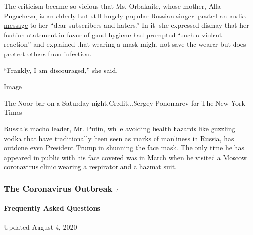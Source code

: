 The criticism became so vicious that Ms. Orbakaite, whose mother, Alla
Pugacheva, is an elderly but still hugely popular Russian singer,
\href{https://www.instagram.com/tv/CCHJPXkpV72/?utm_source=ig_embed}{posted
an audio message} to her ``dear subscribers and haters.'' In it, she
expressed dismay that her fashion statement in favor of good hygiene had
prompted ``such a violent reaction'' and explained that wearing a mask
might not save the wearer but does protect others from infection.

``Frankly, I am discouraged,'' she said.

Image

The Noor bar on a Saturday night.Credit...Sergey Ponomarev for The New
York Times

Russia's
\href{https://www.nytimes.com/2017/08/05/world/europe/vladimir-putin-russia-summer-vacation.html}{macho
leader}, Mr. Putin, while avoiding health hazards like guzzling vodka
that have traditionally been seen as marks of manliness in Russia, has
outdone even President Trump in shunning the face mask. The only time he
has appeared in public with his face covered was in March when he
visited a Moscow coronavirus clinic wearing a respirator and a hazmat
suit.

\href{https://www.nytimes.com/news-event/coronavirus?action=click\&pgtype=Article\&state=default\&region=MAIN_CONTENT_3\&context=storylines_faq}{}

\hypertarget{the-coronavirus-outbreak-}{%
\subsubsection{The Coronavirus Outbreak
›}\label{the-coronavirus-outbreak-}}

\hypertarget{frequently-asked-questions}{%
\paragraph{Frequently Asked
Questions}\label{frequently-asked-questions}}

Updated August 4, 2020


